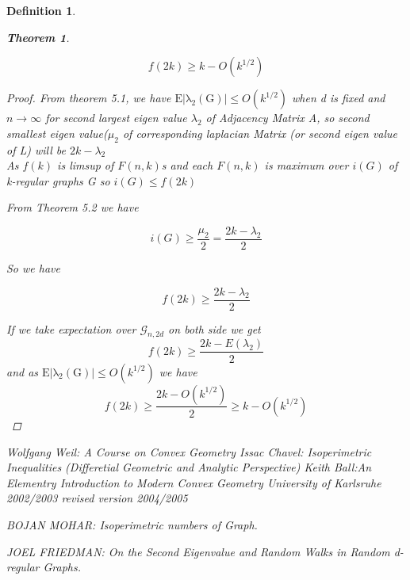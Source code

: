 \documentclass[oneside]{book}
\newtheorem{theorem}{Theorem}[section]
\newtheorem{mydef}{Definition}
\begin{document}
\begin{mydef}
 
\begin{theorem}
 \label{t:15}
 
  
    $$f(2 k) \geq k-O\left(k^{1 / 2}\right)$$ 
    
    \end{theorem}
   
   
\begin{proof} From theorem 5.1, we have  $\mathrm{E|\lambda_{2}(G)|}
    \leq O(k^{1/2})$ when d is fixed and $n\rightarrow \infty$ for second largest eigen value $\lambda_{2}$ of Adjacency Matrix A, so second smallest eigen value($\mu_{2}$ of corresponding laplacian Matrix (or second eigen value of L) will be $2k - \lambda_{2}$ \\
     
     
   As $f(k)$ is limsup of $F(n,k)$s and each $F(n,k)$ is maximum over $i(G)$ of k-regular graphs G
   so $i(G)\leq f(2k)$
   
    From Theorem 5.2 we have
   
        $$i(G) \geq \frac{\mu_2}{2} = \frac{2k - \lambda_{2}}{2}  $$
   
    So we have
    
   $$
        f(2k) \geq \frac{2k - \lambda_{2}}{2}
  $$
  
      If we take expectation over $\mathscr{G}_{n, 2 d}$ on both side we get 
     $$
           f(2k) \geq \frac{2k - E(\lambda_{2})}{2}
     $$
      and as $\mathrm{E|\lambda_{2}(G)|}
    \leq O(k^{1/2})$ we have 
 $$
    f(2k) \geq \frac{2k - O(k^{1/2})}{2} \geq k - O(k^{1/2}) 
 $$
    
  \end{proof}  
    
  
\begin{thebibliography}{300}
 \label{bib:1} 
Wolfgang Weil: A Course
on
Convex Geometry
  \label{bib:2}
Issac Chavel: Isoperimetric Inequalities (Differetial Geometric and Analytic Perspective)
     \label{bib:3}
Keith Ball:An Elementry Introduction to Modern Convex Geometry
University of Karlsruhe
2002/2003
revised version 2004/2005

    \label{bib:4}
     BOJAN MOHAR: Isoperimetric numbers of Graph.
     
    

     \label{bib:5}
    JOEL FRIEDMAN: On the Second Eigenvalue and Random Walks in Random d-regular Graphs.
         \label{bib:6}
     

\end{thebibliography}
\end{mydef}
\end{document}
